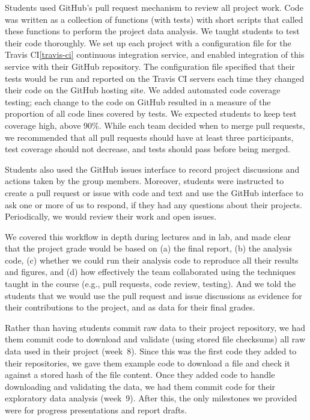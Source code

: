 Students used GitHub's pull request mechanism to review all project work.
Code was written as a collection of functions (with tests) with short
scripts that called these functions to perform the project data analysis.
We taught students to test their code thoroughly.
We set up each project with a configuration file for the Travis
CI\cref{travis-ci} continuous integration service, and enabled integration of
this service with their GitHub repository.  The configuration file specified
that their tests would be run and reported on the Travis CI servers each
time they changed their code on the GitHub hosting site.
We added automated code coverage testing; each change to the code on GitHub
resulted in a measure of the proportion of all code lines covered by tests.
We expected students to keep test coverage high, above 90\%.
While each team decided when to merge pull requests, we recommended that
all pull requests should have at least three participants, test coverage
should not decrease, and tests should pass before being merged.

Students also used the GitHub issues interface to record project discussions
and actions taken by the group members.
Moreover, students were instructed to create a pull request
or issue with code and text and use the GitHub interface to ask one or more
of us to respond, if they had any questions about their projects.
Periodically, we would review their work and open issues.

We covered this workflow in depth during lectures and in lab,
and made clear that the project grade would be based on
(a) the final report,
(b) the analysis code,
(c) whether we could run their analysis code to reproduce all
their results and figures, and
(d) how effectively the team collaborated using the techniques
taught in the course (e.g., pull requests, code review, testing).
And we told the students that we would use the pull request and issue
discussions as evidence for their contributions to the project, and as data for
their final grades.

Rather than having students commit raw data to their project repository, we had
them commit code to download and validate (using stored file checksums)
all raw data used in their project (week~8).
Since this was the first code they added to their repositories, we gave them example
code to download a file and check it against a stored hash of the file
content.
Once they added code to handle downloading and validating the data,
we had them commit code for their exploratory data analysis (week~9).
After this, the only milestones we provided were for progress
presentations and report drafts.

